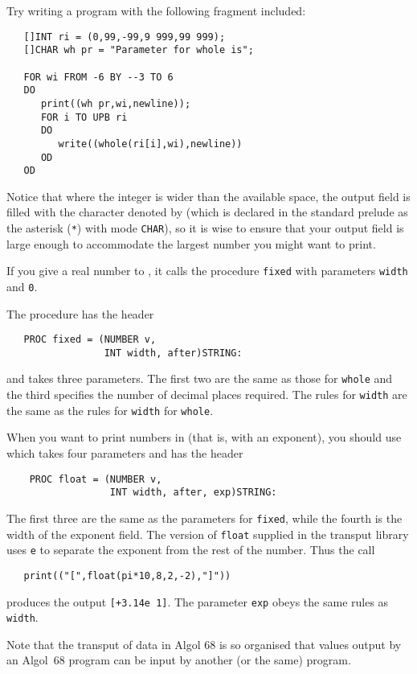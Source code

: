 Try writing a program with the following fragment included:
\begin{verbatim}
   []INT ri = (0,99,-99,9 999,99 999);
   []CHAR wh pr = "Parameter for whole is";
   
   FOR wi FROM -6 BY --3 TO 6
   DO
      print((wh pr,wi,newline));
      FOR i TO UPB ri
      DO
         write((whole(ri[i],wi),newline))
      OD
   OD
\end{verbatim}
\noindent
Notice that where the integer is wider than the available space, the
output field is filled with the character denoted by
 (which is declared in the standard prelude as the
asterisk (\verb|*|) with mode \verb|CHAR|), so it is wise to ensure
that your output field is large enough to accommodate the largest
number you might want to print.

If you give a real number to , it calls
the procedure \verb|fixed| with parameters \verb|width| and \verb|0|.

The procedure  has the header
\begin{verbatim}
   PROC fixed = (NUMBER v,
                 INT width, after)STRING:
\end{verbatim}
\noindent
and takes three parameters.  The first two are the same as those for
\verb|whole| and the third specifies the number of decimal places
required.  The rules for \verb|width| are the same as the rules for
\verb|width| for \verb|whole|.

When you want to print numbers in  (that is,
with an exponent), you should use  which takes four
parameters and has the header
\begin{verbatim}
    PROC float = (NUMBER v,
                  INT width, after, exp)STRING:
\end{verbatim}
\noindent
The first three are the same as the parameters for \verb|fixed|,
while the fourth is the width of the exponent field.  The version of
\verb|float| supplied in the transput library uses \verb|e| to
separate the exponent from the rest of the number. Thus the call
\begin{verbatim}
   print(("[",float(pi*10,8,2,-2),"]"))
\end{verbatim}
\noindent
produces the output \verb|[+3.14e 1]|. The parameter \verb|exp| obeys
the same rules as \verb|width|.

Note that the transput of data in Algol 68 is so organised that values
output by an Algol~68 program can be input by another (or the same)
program.

